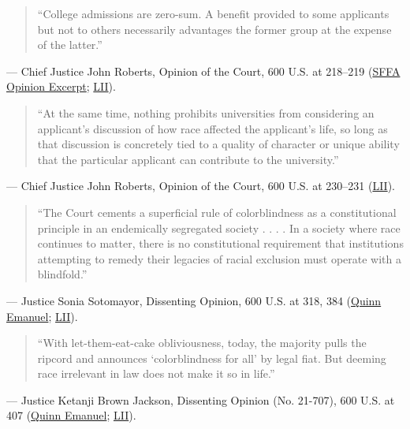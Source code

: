 \documentclass[12pt]{article}
\begin{document}
\begin{quote}
``College admissions are zero-sum. A benefit provided to some applicants but not to others necessarily advantages the former group at the expense of the latter.''
\end{quote}
\noindent --- Chief Justice John Roberts, Opinion of the Court, 600 U.S. at 218--219 (\href{https://tikvah.org/wp-content/uploads/2026/05/Students-for-Fair-Admissions.pdf}{SFFA Opinion Excerpt}; \href{https://www.law.cornell.edu/supremecourt/text/20-1199}{LII}).

\begin{quote}
``At the same time, nothing prohibits universities from considering an applicant's discussion of how race affected the applicant's life, so long as that discussion is concretely tied to a quality of character or unique ability that the particular applicant can contribute to the university.''
\end{quote}
\noindent --- Chief Justice John Roberts, Opinion of the Court, 600 U.S. at 230--231 (\href{https://www.law.cornell.edu/supremecourt/text/20-1199}{LII}).

\begin{quote}
``The Court cements a superficial rule of colorblindness as a constitutional principle in an endemically segregated society . . . . In a society where race continues to matter, there is no constitutional requirement that institutions attempting to remedy their legacies of racial exclusion must operate with a blindfold.''
\end{quote}
\noindent --- Justice Sonia Sotomayor, Dissenting Opinion, 600 U.S. at 318, 384 (\href{https://www.quinnemanuel.com/the-firm/publications/the-road-ahead-fostering-diversity-after-the-supreme-court-s-decision-overturning-affirmative-action-in-university-admissions/}{Quinn Emanuel}; \href{https://www.law.cornell.edu/supremecourt/text/20-1199}{LII}).

\begin{quote}
``With let-them-eat-cake obliviousness, today, the majority pulls the ripcord and announces `colorblindness for all' by legal fiat. But deeming race irrelevant in law does not make it so in life.''
\end{quote}
\noindent --- Justice Ketanji Brown Jackson, Dissenting Opinion (No. 21-707), 600 U.S. at 407 (\href{https://www.quinnemanuel.com/the-firm/publications/the-road-ahead-fostering-diversity-after-the-supreme-court-s-decision-overturning-affirmative-action-in-university-admissions/}{Quinn Emanuel}; \href{https://www.law.cornell.edu/supremecourt/text/20-1199}{LII}).
\end{document}
